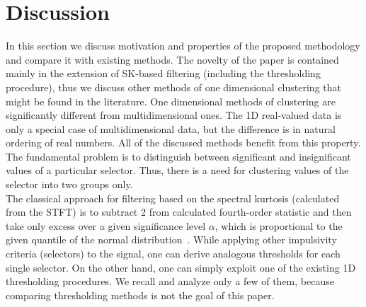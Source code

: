 \documentclass[11pt]{article} %
\begin{document}
\section{Discussion}\label{discussion}
In this section we discuss motivation and properties of the proposed methodology and compare it with existing methods. The novelty of the paper is contained mainly in the extension of SK-based filtering (including the thresholding procedure), thus we discuss other methods of one dimensional clustering that might be found in the literature. One dimensional methods of clustering are significantly different from multidimensional ones. The 1D real-valued data is only a special case of multidimensional data, but the difference is in natural ordering of real numbers. All of the discussed methods benefit from this property. The fundamental problem is to distinguish between significant and insignificant values of a particular selector. Thus, there is a need for clustering values of the selector into two groups only.\\
The classical approach for filtering based on the spectral kurtosis (calculated from the STFT) is to subtract 2 from calculated fourth-order statistic and then take only excess over a given significance level $\alpha$, which is proportional to the given quantile of the normal distribution~\cite{CombetSK,Antoni2SK}. While applying other impulsivity criteria (selectors) to the signal, one can derive analogous thresholds for each single selector. On the other hand, one can simply exploit one of the existing 1D thresholding procedures. We recall and analyze only a few of them, because comparing thresholding methods is not the goal of this paper.\\
\end{document}

